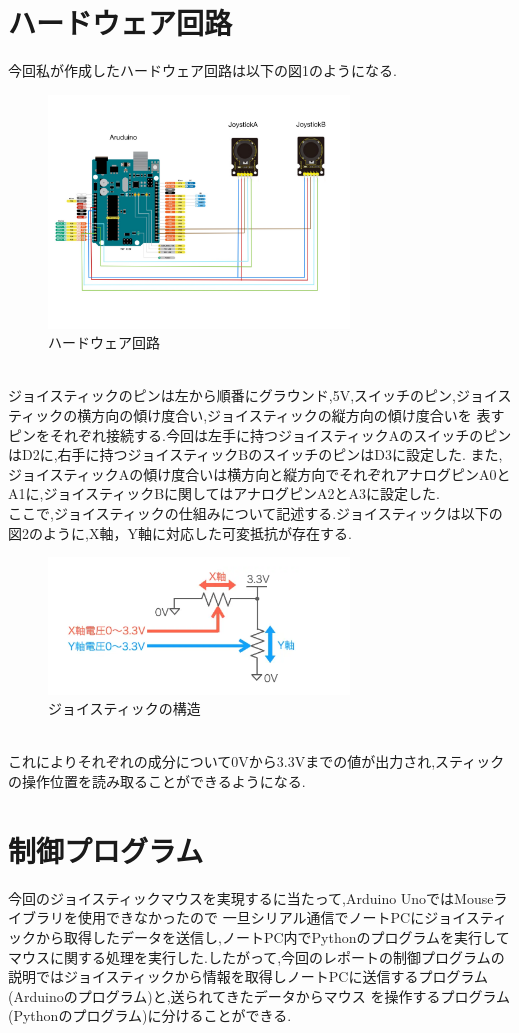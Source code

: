\documentclass[dvipdfmx]{jarticle}
\begin{document}
\section{ハードウェア回路}
今回私が作成したハードウェア回路は以下の図1のようになる.\cite{1}\cite{6}
\begin{figure}[h]
    \centering
    \includegraphics[width=8cm]{kairo.jpg}
    \caption{ハードウェア回路}
\end{figure}
\\ジョイスティックのピンは左から順番にグラウンド,5V,スイッチのピン,ジョイスティックの横方向の傾け度合い,ジョイスティックの縦方向の傾け度合いを
表すピンをそれぞれ接続する.今回は左手に持つジョイスティックAのスイッチのピンはD2に,右手に持つジョイスティックBのスイッチのピンはD3に設定した.
また,ジョイスティックAの傾け度合いは横方向と縦方向でそれぞれアナログピンA0とA1に,ジョイスティックBに関してはアナログピンA2とA3に設定した.
\\ここで,ジョイスティックの仕組みについて記述する.ジョイスティックは以下の図2のように,X軸，Y軸に対応した可変抵抗が存在する.\cite{7}
\begin{figure}[h]
    \centering
    \includegraphics[width=8cm]{joystick.png}
    \caption{ジョイスティックの構造}
\end{figure}
\\これによりそれぞれの成分について0Vから3.3Vまでの値が出力され,スティックの操作位置を読み取ることができるようになる.
\section{制御プログラム}
今回のジョイスティックマウスを実現するに当たって,Arduino UnoではMouseライブラリを使用できなかったので
一旦シリアル通信でノートPCにジョイスティックから取得したデータを送信し,ノートPC内でPythonのプログラムを実行して
マウスに関する処理を実行した.\cite{2}したがって,今回のレポートの制御プログラムの説明ではジョイスティックから情報を取得しノートPCに送信するプログラム(Arduinoのプログラム)と,送られてきたデータからマウス
を操作するプログラム(Pythonのプログラム)に分けることができる.
\end{document}
